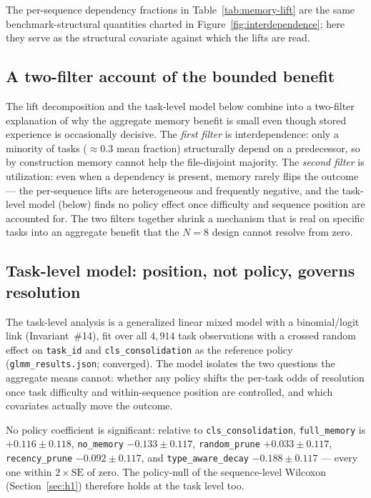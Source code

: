 \noindent The per-sequence dependency fractions in Table~\ref{tab:memory-lift} are the same
benchmark-structural quantities charted in Figure~\ref{fig:interdependence}; here they serve
as the structural covariate against which the lifts are read.

\subsection{A two-filter account of the bounded benefit}

The lift decomposition and the task-level model below combine into a two-filter explanation
of why the aggregate memory benefit is small even though stored experience is occasionally
decisive. The \emph{first filter} is interdependence: only a minority of tasks
($\approx 0.3$ mean fraction) structurally depend on a predecessor, so by construction memory
cannot help the file-disjoint majority. The \emph{second filter} is utilization: even when a
dependency is present, memory rarely flips the outcome --- the per-sequence lifts are
heterogeneous and frequently negative, and the task-level model (below) finds no policy
effect once difficulty and sequence position are accounted for. The two filters together
shrink a mechanism that is real on specific tasks into an aggregate benefit that the $N=8$
design cannot resolve from zero.

\subsection{Task-level model: position, not policy, governs resolution}

The task-level analysis is a generalized linear mixed model with a binomial/logit link
(Invariant~\#14), fit over all $4{,}914$ task observations with a crossed random effect on
\texttt{task\_id} and \texttt{cls\_consolidation} as the reference policy
(\texttt{glmm\_results.json}; converged). The model isolates the two questions the aggregate
means cannot: whether any policy shifts the per-task odds of resolution once task difficulty
and within-sequence position are controlled, and which covariates actually move the outcome.

No policy coefficient is significant: relative to \texttt{cls\_consolidation},
\texttt{full\_memory} is $+0.116 \pm 0.118$, \texttt{no\_memory} $-0.133 \pm 0.117$,
\texttt{random\_prune} $+0.033 \pm 0.117$, \texttt{recency\_prune} $-0.092 \pm 0.117$, and
\texttt{type\_aware\_decay} $-0.188 \pm 0.117$ --- every one within $2 \times \mathrm{SE}$ of
zero. The policy-null of the sequence-level Wilcoxon (Section~\ref{sec:h1}) therefore holds
at the task level too.

